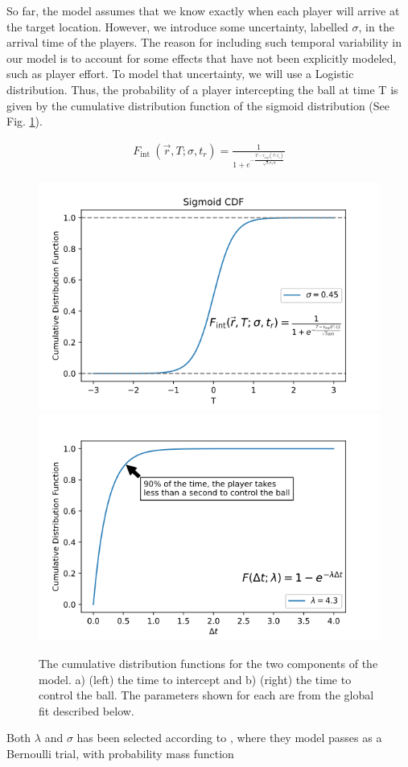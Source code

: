 \documentclass[
  10pt,
  twoside,nohyper]{book}
\begin{document}
So far, the model assumes that we know exactly when each player will arrive at the target location. However, we introduce some uncertainty, labelled \(\sigma\), in the arrival time of the players. The reason for including such temporal variability in our model is to account for some effects that have not been explicitly modeled, such as player effort. To model that uncertainty, we will use a Logistic distribution. Thus, the probability of a player intercepting the ball at time T is given by the cumulative distribution function of the sigmoid distribution \citep{SpearmanFit} (See Fig. \ref{fig:lambda}).

\begin{align}
    F_{\text {int }}(\vec{r},T;\sigma, t_r)=\frac{1}{1+e^{-\frac{T- \tau_{exp}(\vec{r} ; t_r)}{\sqrt{3} \sigma / \pi}}}
    \label{sigmoid}
\end{align}

\begin{figure}[H]

{\centering \includegraphics[width=0.45\linewidth,]{imagenes/sigmoid_poster} \includegraphics[width=0.45\linewidth,]{imagenes/exp_poster} 

}

\caption{The cumulative distribution functions for the two components of the model. a) (left) the time to intercept and b) (right) the time to control the ball.    The parameters shown for each are from the global fit described below.}\label{fig:lambda}
\end{figure}

Both \(\lambda\) and \(\sigma\) has been selected according to \citep{SpearmanFit}, where they model passes as a Bernoulli trial, with probability mass function
\end{document}
